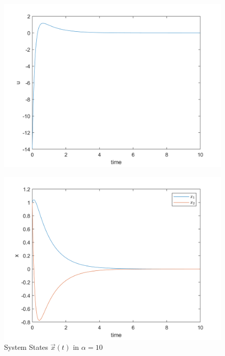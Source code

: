 \begin{itemize}
\begin{figure}[H]
	\includegraphics[width=12cm]{../Code/Q3/figures/ualpha10.png}
\end{figure}
\begin{figure}[H]
	\caption{System States $\vec x(t)$ in $\alpha = 10$}
	\centering
	\includegraphics[width=12cm]{../Code/Q3/figures/xalpha10.png}
\end{figure}
\end{itemize}